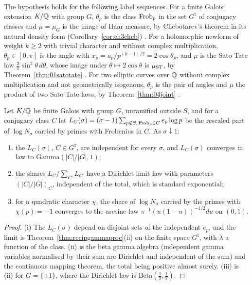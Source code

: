 The hypothesis holds for the following label sequences. For a finite Galois extension $K/\mathbb{Q}$ with group $G$, $\theta_p$ is the class $\operatorname{Frob}_p$ in the set $G^\natural$ of conjugacy classes and $\mu=\mu_G$ is the image of Haar measure, by Chebotarev's theorem in its natural density form (Corollary~\ref{cor:ch3cheb}) \cite{chebotarev1926}. For a holomorphic newform of weight $k\ge2$ with trivial character and without complex multiplication, $\theta_p\in[0,\pi]$ is the angle with $x_p=a_p/p^{(k-1)/2}=2\cos\theta_p$, and $\mu$ is the Sato Tate law $\frac2\pi\sin^2\theta\,d\theta$, whose image under $\theta\mapsto2\cos\theta$ is $\mu_{\mathrm{ST}}$, by Theorem~\ref{thm:01satotate} \cite{blght2011}. For two elliptic curves over $\mathbb{Q}$ without complex multiplication and not geometrically isogenous, $\theta_p$ is the pair of angles and $\mu$ the product of two Sato Tate laws, by Theorem~\ref{thm:04joint} \cite{harris2009}.

\begin{corollary}\label{cor:recipchebgamma}
Let $K/\mathbb{Q}$ be finite Galois with group $G$, unramified outside $S$, and for a conjugacy class $C$ let $L_C(\sigma)=(\sigma-1)\sum_{p\notin S,\,\operatorname{Frob}_p\in C}e_p\log p$ be the rescaled part of $\log N_\sigma$ carried by primes with Frobenius in $C$. As $\sigma\downarrow1$:
\begin{enumerate}
\item[(i)] the $L_C(\sigma)$, $C\in G^\natural$, are independent for every $\sigma$, and $L_C(\sigma)$ converges in law to $\mathrm{Gamma}(|C|/|G|,1)$;
\item[(ii)] the shares $L_C/\sum_{C'}L_{C'}$ have a Dirichlet limit law with parameters $(|C|/|G|)_C$, independent of the total, which is standard exponential;
\item[(iii)] for a quadratic character $\chi$, the share of $\log N_\sigma$ carried by the primes with $\chi(p)=-1$ converges to the arcsine law $\pi^{-1}(u(1-u))^{-1/2}du$ on $(0,1)$.
\end{enumerate}
\end{corollary}

\begin{proof}
(i) The $L_C(\sigma)$ depend on disjoint sets of the independent $e_p$, and the limit is Theorem~\ref{thm:recipgammaproc}(ii) on the finite space $G^\natural$, with $\lambda$ a function of the class. (ii) is the beta gamma algebra (independent gamma variables normalised by their sum are Dirichlet and independent of the sum) and the continuous mapping theorem, the total being positive almost surely. (iii) is (ii) for $G=\{\pm1\}$, where the Dirichlet law is $\mathrm{Beta}(\frac12,\frac12)$.
\end{proof}

